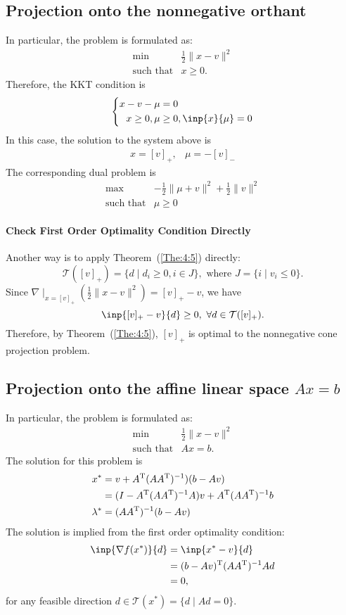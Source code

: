 \subsection{Projection onto the nonnegative orthant}
In particular, the problem is formulated as:
\begin{equation}
\begin{array}{ll}
\min&\frac{1}{2}\|x-v\|^2\\
\mbox{such that}&x\ge0.
\end{array}
\end{equation}
Therefore, the KKT condition is
\[
\left\{
\begin{aligned}
x-v-\mu&=0\\
x\ge0,\mu&\ge0,\inp{x}{\mu}=0
\end{aligned}
\right.
\]
In this case, the solution to the system above is
\[
\begin{array}{ll}
x=[v]_+,
&
\mu=-[v]_-
\end{array}
\]
The corresponding dual problem is
\[
\begin{array}{ll}
\max&-\frac{1}{2}\|\mu+v\|^2+\frac{1}{2}\|v\|^2\\
\mbox{such that}&\mu\ge0
\end{array}
\]

\paragraph{Check First Order Optimality Condition Directly}
Another way is to apply Theorem~(\ref{The:4:5}) directly:
\[
\mathcal{T}([v]_+) = \{d\mid d_i\ge0, i\in J\},\text{ where }J = \{i\mid v_i\le0\}.
\]
Since $\nabla\mid_{x=[v]_+}(\frac{1}{2}\|x-v\|^2) = [v]_+-v$, we have
\[
\inp{[v]_+-v}{d}\ge0,\ \forall d\in\mathcal{T}([v]_+).
\]
Therefore, by Theorem~(\ref{The:4:5}), $[v]_+$ is optimal to the nonnegative cone
projection problem.

\subsection{Projection onto the affine linear space $Ax=b$}
In particular, the problem is formulated as:
\begin{equation}
\begin{array}{ll}
\min&\frac{1}{2}\|x-v\|^2\\
\mbox{such that}&Ax=b.
\end{array}
\end{equation}
The solution for this problem is
\begin{align*}
x^* &= v + A^{\mathrm T}(AA^{\mathrm T})^{-1})(b - Av)\\
&=(I - A^{\mathrm T}(AA^{\mathrm T})^{-1}A)v + A^{\mathrm T}(AA^{\mathrm T})^{-1}b\\
\lambda^*&=(AA^{\mathrm T})^{-1}(b - Av)
\end{align*}
The solution is implied from the first order optimality condition:
\begin{align*}
\inp{\nabla f(x^*)}{d}&=\inp{x^*-v}{d}\\
&=(b-Av)\trans(AA\trans)^{-1}Ad\\
&=0,
\end{align*}
for any feasible direction $d\in\mathcal{T}(x^*)=\{d\mid Ad=0\}$.

